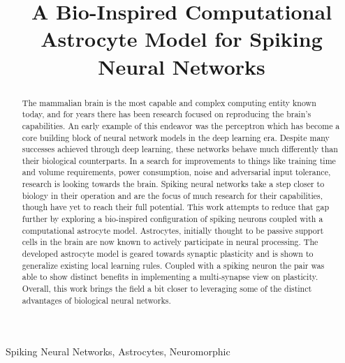 \documentclass[conference]{IEEEtran}
\title{A Bio-Inspired Computational Astrocyte Model for Spiking Neural Networks}
\author{\IEEEauthorblockN{Jacob Kiggins}
\IEEEauthorblockA{\textit{Computer Engineering Dept.} \\
\textit{Rochester Institute of Technology}\\
Rochester, USA \\
jmk1154@rit.edu}}
\begin{document}
\maketitle

\begin{abstract}
The mammalian brain is the most capable and complex computing entity known
today, and for years there has been research focused on reproducing the brain's
capabilities. An early example of this endeavor was the perceptron which has
become a core building block of neural network models in the deep learning
era. Despite many successes achieved through deep learning, these networks
behave much differently than their biological counterparts. In a search for
improvements to things like training time and volume requirements, power
consumption, noise and adversarial input tolerance, research is looking towards
the brain. Spiking neural networks take a step closer to biology in their
operation and are the focus of much research for their capabilities, though have
yet to reach their full potential. This work attempts to reduce that gap further
by exploring a bio-inspired configuration of spiking neurons coupled with a
computational astrocyte model. Astrocytes, initially thought to be passive
support cells in the brain are now known to actively participate in neural
processing. The developed astrocyte model is geared towards synaptic plasticity
and is shown to generalize existing local learning rules. Coupled with a spiking
neuron the pair was able to show distinct benefits in implementing a
multi-synapse view on plasticity.  Overall, this work brings the field a bit
closer to leveraging some of the distinct advantages of biological neural
networks.

\end{abstract}

\begin{IEEEkeywords}
Spiking Neural Networks, Astrocytes, Neuromorphic
\end{IEEEkeywords}
\end{document}
